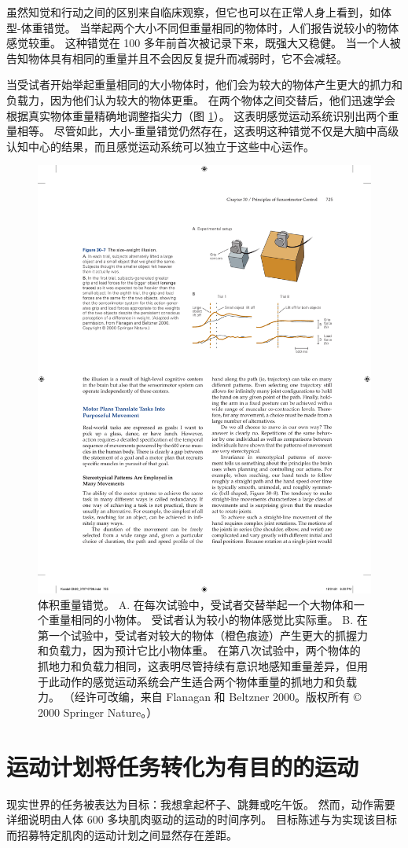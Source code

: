 虽然知觉和行动之间的区别来自临床观察，但它也可以在正常人身上看到，如体型-体重错觉。 当举起两个大小不同但重量相同的物体时，人们报告说较小的物体感觉较重。 这种错觉在 100 多年前首次被记录下来，既强大又稳健。 当一个人被告知物体具有相同的重量并且不会因反复提升而减弱时，它不会减轻。

当受试者开始举起重量相同的大小物体时，他们会为较大的物体产生更大的抓力和负载力，因为他们认为较大的物体更重。 
在两个物体之间交替后，他们迅速学会根据真实物体重量精确地调整指尖力（图 \ref{fig:30_7}）。 
这表明感觉运动系统识别出两个重量相等。 尽管如此，大小-重量错觉仍然存在，这表明这种错觉不仅是大脑中高级认知中心的结果，而且感觉运动系统可以独立于这些中心运作。

\begin{figure}[htbp]
	\centering
	\includegraphics[width=0.6\linewidth]{chap30/fig_30_7}
	\caption{体积重量错觉。 A. 在每次试验中，受试者交替举起一个大物体和一个重量相同的小物体。 受试者认为较小的物体感觉比实际重。 B. 在第一个试验中，受试者对较大的物体（橙色痕迹）产生更大的抓握力和负载力，因为预计它比小物体重。 在第八次试验中，两个物体的抓地力和负载力相同，这表明尽管持续有意识地感知重量差异，但用于此动作的感觉运动系统会产生适合两个物体重量的抓地力和负载力。 （经许可改编，来自 Flanagan 和 Beltzner 2000。版权所有 © 2000 Springer Nature。）}
	\label{fig:30_7}
\end{figure}

\section{运动计划将任务转化为有目的的运动}
现实世界的任务被表达为目标：我想拿起杯子、跳舞或吃午饭。 然而，动作需要详细说明由人体 600 多块肌肉驱动的运动的时间序列。 目标陈述与为实现该目标而招募特定肌肉的运动计划之间显然存在差距。

